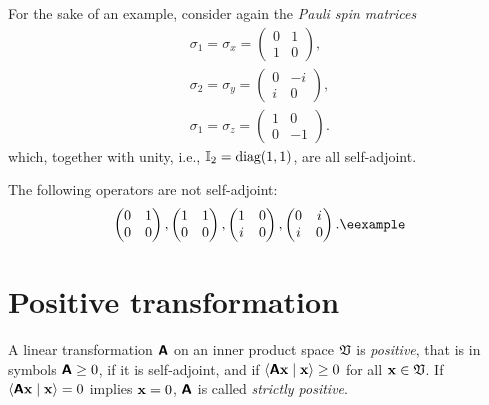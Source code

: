 {\color{blue}
\bexample
For the sake of an example, consider again the
{\em Pauli spin matrices}
\begin{equation}
\begin{split}
\sigma_1=\sigma_x=
\begin{pmatrix}
0&1\\
1&0
\end{pmatrix}
,   \\
\sigma_2=\sigma_y=
\begin{pmatrix}
0&-i\\
i&0
\end{pmatrix}
,   \\
\sigma_1=\sigma_z=
\begin{pmatrix}
1&0\\
0&-1
\end{pmatrix}
.
\end{split}
\end{equation}
which, together with unity, i.e., ${\Bbb I}_2=\textrm{diag}(1,1)$,  are all self-adjoint.

The following operators are not self-adjoint:
\begin{equation}
\begin{pmatrix}
0&1\\
0&0
\end{pmatrix}
 ,
\begin{pmatrix}
1&1\\
0&0
\end{pmatrix}
,
\begin{pmatrix}
1&0\\
i&0
\end{pmatrix}
,
\begin{pmatrix}
0&i\\
i&0
\end{pmatrix}
.{\textrm{\eexample}}
\end{equation}
%
}

\section{Positive transformation}

A linear transformation  $\textsf{\textbf{A}}$ on an inner product space ${\frak V}$ is {\em positive},
that is in symbols $\textsf{\textbf{A}}\ge 0$, if it is self-adjoint,
and if $\langle \textsf{\textbf{A}}{\bf x}\mid {\bf x}\rangle  \ge 0$ for all ${\bf x}\in {\frak V}$.
If  $\langle \textsf{\textbf{A}}{\bf x}\mid {\bf x}\rangle = 0$ implies
${\bf x}=0$, $\textsf{\textbf{A}}$ is called {\em strictly positive}.


